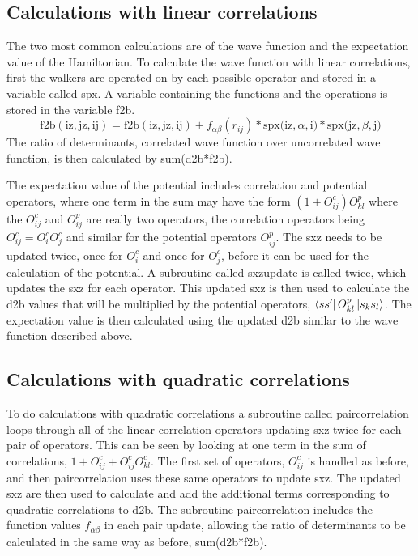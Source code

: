 \subsection{Calculations with linear correlations}
The two most common calculations are of the wave function and the expectation value of the Hamiltonian. To calculate the wave function with linear correlations, first the walkers are operated on by each possible operator and stored in a variable called spx. A variable containing the functions and the operations is stored in the variable f2b.
\begin{equation}
   \mathrm{f2b(iz,jz,ij)=f2b(iz,jz,ij)+}f_{\alpha\beta}(r_{ij})*\mathrm{spx(iz,}\alpha\mathrm{,i)*spx(jz,}\beta\mathrm{,j)}
\end{equation}
The ratio of determinants, correlated wave function over uncorrelated wave function, is then calculated by sum(d2b*f2b).

The expectation value of the potential includes correlation and potential operators, where one term in the sum may have the form $\left(1+O^c_{ij}\right)O^p_{kl}$ where the $O^c_{ij}$ and $O^p_{ij}$ are really two operators, the correlation operators being $O^c_{ij}=O^c_iO^c_j$ and similar for the potential operators $O^p_{ij}$. The sxz needs to be updated twice, once for $O^c_i$ and once for $O^c_j$, before it can be used for the calculation of the potential. A subroutine called sxzupdate is called twice, which updates the sxz for each operator. This updated sxz is then used to calculate the d2b values that will be multiplied by the potential operators, $\left< ss' \right|O^p_{kl}\left| s_ks_l \right>$. The expectation value is then calculated using the updated d2b similar to the wave function described above.

\subsection{Calculations with quadratic correlations}
To do calculations with quadratic correlations a subroutine called paircorrelation loops through all of the linear correlation operators updating sxz twice for each pair of operators. This can be seen by looking at one term in the sum of correlations, $1+O^c_{ij}+O^c_{ij}O^c_{kl}$. The first set of operators, $O^c_{ij}$ is handled as before, and then paircorrelation uses these same operators to update sxz. The updated sxz are then used to calculate and add the additional terms corresponding to quadratic correlations to d2b. The subroutine paircorrelation includes the function values $f_{\alpha\beta}$ in each pair update, allowing the ratio of determinants to be calculated in the same way as before, sum(d2b*f2b).

